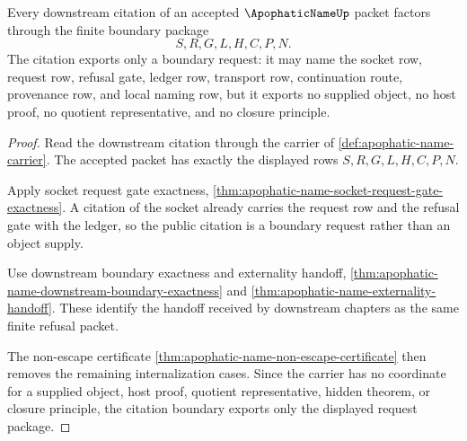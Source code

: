 \begin{theorem}
\label{thm:apophatic-name-consumer-citation-boundary}
Every downstream citation of an accepted $\ApophaticNameUp$ packet factors through the finite boundary package
$$
S,R,G,L,H,C,P,N.
$$
The citation exports only a boundary request: it may name the socket row, request row, refusal gate, ledger row, transport row, continuation route, provenance row, and local naming row, but it exports no supplied object, no host proof, no quotient representative, and no closure principle.
\end{theorem}
\begin{proof}
Read the downstream citation through the carrier of \autoref{def:apophatic-name-carrier}. The accepted packet has exactly the displayed rows $S,R,G,L,H,C,P,N$.

Apply socket request gate exactness, \autoref{thm:apophatic-name-socket-request-gate-exactness}. A citation of the socket already carries the request row and the refusal gate with the ledger, so the public citation is a boundary request rather than an object supply.

Use downstream boundary exactness and externality handoff, \autoref{thm:apophatic-name-downstream-boundary-exactness} and \autoref{thm:apophatic-name-externality-handoff}. These identify the handoff received by downstream chapters as the same finite refusal packet.

The non-escape certificate \autoref{thm:apophatic-name-non-escape-certificate} then removes the remaining internalization cases. Since the carrier has no coordinate for a supplied object, host proof, quotient representative, hidden theorem, or closure principle, the citation boundary exports only the displayed request package.
\end{proof}

